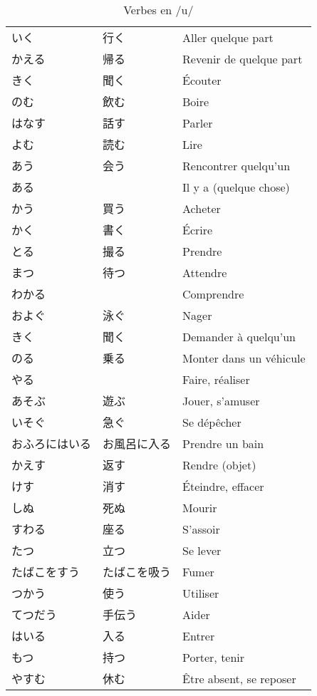 \documentclass[a4paper,10pt,french,openany]{memoir}
\begin{document}
\begin{table}[h]
 \centering
 \caption{Verbes en /u/}
 \label{tab:verbes-u}
 \begin{tabular}{lll}
  いく & 行く & Aller quelque part \\
  かえる & 帰る & Revenir de quelque part \\
  きく & 聞く & Écouter \\
  のむ & 飲む & Boire \\
  はなす & 話す & Parler \\
  よむ & 読む & Lire \\
  あう & 会う & Rencontrer quelqu'un \\
  ある & & Il y a (quelque chose) \\
  かう & 買う & Acheter \\
  かく & 書く & Écrire \\
  とる & 撮る & Prendre \\
  まつ & 待つ & Attendre \\
  わかる & & Comprendre \\
  およぐ & 泳ぐ & Nager \\
  きく & 聞く & Demander à quelqu'un \\
  のる & 乗る & Monter dans un véhicule \\
  やる & & Faire, réaliser \\
  あそぶ & 遊ぶ & Jouer, s'amuser \\
  いそぐ & 急ぐ & Se dépêcher \\
  おふろにはいる & お風呂に入る & Prendre un bain \\
  かえす & 返す & Rendre (objet) \\
  けす & 消す & Éteindre, effacer \\
  しぬ & 死ぬ & Mourir \\
  すわる & 座る & S'assoir \\
  たつ & 立つ & Se lever \\
  たばこをすう & たばこを吸う & Fumer \\
  つかう & 使う & Utiliser \\
  てつだう & 手伝う & Aider \\
  はいる & 入る & Entrer \\
  もつ & 持つ & Porter, tenir \\
  やすむ & 休む & Être absent, se reposer \\
 \end{tabular}
\end{table}
\end{document}
